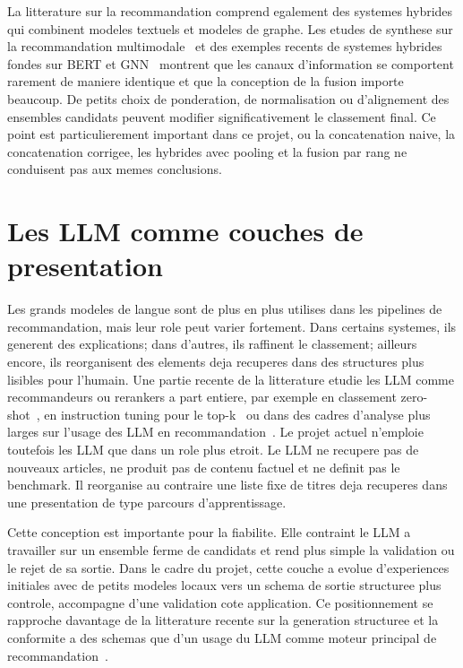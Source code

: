 La litterature sur la recommandation comprend egalement des systemes hybrides
qui combinent modeles textuels et modeles de graphe. Les etudes de synthese sur
la recommandation multimodale~\cite{zhou2023multimodal} et des exemples
recents de systemes hybrides fondes sur BERT et GNN~\cite{anime_hybrid_gnn_bert}
montrent que les canaux d'information se comportent rarement de maniere
identique et que la conception de la fusion importe beaucoup. De petits choix
de ponderation, de normalisation ou d'alignement des ensembles candidats
peuvent modifier significativement le classement final. Ce point est
particulierement important dans ce projet, ou la concatenation naive, la
concatenation corrigee, les hybrides avec pooling et la fusion par rang ne
conduisent pas aux memes conclusions.

\section{Les LLM comme couches de presentation}

Les grands modeles de langue sont de plus en plus utilises dans les pipelines
de recommandation, mais leur role peut varier fortement. Dans certains
systemes, ils generent des explications; dans d'autres, ils raffinent le
classement; ailleurs encore, ils reorganisent des elements deja recuperes dans
des structures plus lisibles pour l'humain. Une partie recente de la
litterature etudie les LLM comme recommandeurs ou rerankers a part entiere,
par exemple en classement zero-shot~\cite{hou2023zeroshotrankers}, en
instruction tuning pour le top-k~\cite{luo2023recranker} ou dans des cadres
d'analyse plus larges sur l'usage des LLM en recommandation~\cite{xu2024tapping}.
Le projet actuel n'emploie toutefois les LLM que dans un role plus etroit. Le
LLM ne recupere pas de nouveaux articles, ne produit pas de contenu factuel et
ne definit pas le benchmark. Il reorganise au contraire une liste fixe de
titres deja recuperes dans une presentation de type parcours d'apprentissage.

Cette conception est importante pour la fiabilite. Elle contraint le LLM a
travailler sur un ensemble ferme de candidats et rend plus simple la validation
ou le rejet de sa sortie. Dans le cadre du projet, cette couche a evolue
d'experiences initiales avec de petits modeles locaux vers un schema de sortie
structuree plus controle, accompagne d'une validation cote application. Ce
positionnement se rapproche davantage de la litterature recente sur la
generation structuree et la conformite a des schemas que d'un usage du LLM
comme moteur principal de recommandation~\cite{geng2025structured}.

